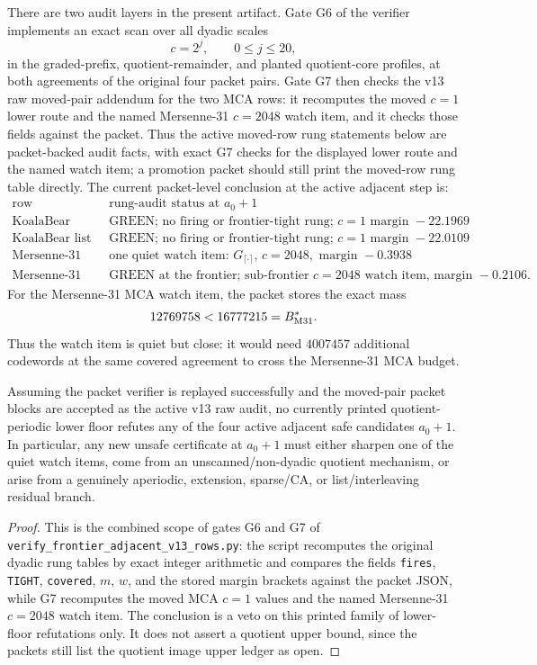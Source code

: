 There are two audit layers in the present artifact.  Gate G6 of the verifier
implements an exact scan over all dyadic scales
\[
        c=2^j,\qquad 0\le j\le20,
\]
in the graded-prefix, quotient-remainder, and planted quotient-core profiles,
at both agreements of the original four packet pairs.  Gate G7 then checks the
v13 raw moved-pair addendum for the two MCA rows: it recomputes the moved
\(c=1\) lower route and the named Mersenne-31 \(c=2048\) watch item, and it
checks those fields against the packet.  Thus the active moved-row rung
statements below are packet-backed audit facts, with exact G7 checks for the
displayed lower route and the named watch item; a promotion packet should still
print the moved-row rung table directly.  The current packet-level conclusion
at the active adjacent step is:
\[
\begin{array}{c|l}
\text{row} & \text{rung-audit status at }a_0+1\\ \hline
\text{KoalaBear MCA} &
\text{GREEN; no firing or frontier-tight rung; }c=1\text{ margin }-22.1969\\
\text{KoalaBear list} &
\text{GREEN; no firing or frontier-tight rung; }c=1\text{ margin }-22.0109\\
\text{Mersenne-31 MCA} &
\text{one quiet watch item: }G_{\lceil\cdot\rceil},\,c=2048,\text{ margin }-0.3938\\
\text{Mersenne-31 list} &
\text{GREEN at the frontier; sub-frontier }c=2048\text{ watch item, margin }-0.2106.
\end{array}
\]
For the Mersenne-31 MCA watch item, the packet stores the exact mass
\[
        12769758<16777215=B^*_{\rm M31}.
\]
Thus the watch item is quiet but close: it would need \(4007457\) additional
codewords at the same covered agreement to cross the Mersenne-31 MCA budget.

\begin{proposition}
\label{prop:finite-rung-veto}
Assuming the packet verifier is replayed successfully and the moved-pair
packet blocks are accepted as the active v13 raw audit, no currently printed
quotient-periodic lower floor refutes any of the four active adjacent safe
candidates \(a_0+1\).  In particular, any new unsafe certificate at \(a_0+1\)
must either sharpen one of the quiet watch items, come from an
unscanned/non-dyadic quotient mechanism, or arise from a genuinely aperiodic,
extension, sparse/CA, or list/interleaving residual branch.
\end{proposition}

\begin{proof}
This is the combined scope of gates G6 and G7 of
\texttt{verify\_frontier\_adjacent\_v13\_rows.py}: the script recomputes the
original dyadic rung tables by exact integer arithmetic and compares the fields
\texttt{fires}, \texttt{TIGHT}, \texttt{covered}, \(m\), \(w\), and the stored
margin brackets against the packet JSON, while G7 recomputes the moved MCA
\(c=1\) values and the named Mersenne-31 \(c=2048\) watch item.  The conclusion
is a veto on this printed family of lower-floor refutations only.  It does not
assert a quotient upper bound, since the packets still list the quotient image
upper ledger as open.
\end{proof}

